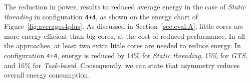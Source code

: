 

The reduction in power, results to reduced average energy in the case of 
\emph{Static threading} in configuration \texttt{4+4}, as shown on the energy chart of 
Figure~\ref{fig:averages4plus}. As discussed in Section~\ref{sec:eval:A}, little cores are more energy 
efficient than big cores, at the cost of reduced performance. In all the approaches, at least two 
extra little cores are needed to reduce energy. In configuration \texttt{4+4}, energy is reduced by 
14\% for \emph{Static threading}, 15\% for \emph{GTS}, and 16\% for \emph{Task-based}. Consequently, we can state that asymmetry reduces overall energy consumption.

